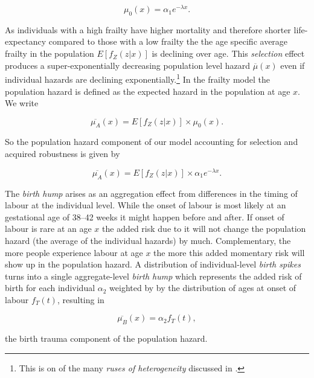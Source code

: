 \documentclass[12pt, parskip=half]{scrartcl}
\begin{document}
\begin{equation}
  \mu_0(x) = \alpha_1 e^{-\lambda x}.
  \label{eq:baselinehzrd}
\end{equation}

As individuals with a high frailty have higher mortality and therefore shorter life-expectancy compared to those with a low frailty the the age specific average frailty in the population $E[f_Z(z|x)]$ is declining over age. This \emph{selection} effect produces a super-exponentially decreasing population level hazard $\overline{\mu}(x)$ even if individual hazards are declining exponentially.\footnote{This is on of the many \emph{ruses of heterogeneity} discussed in \cite{Vaupel1985}.} In the frailty model the population hazard is defined as the expected hazard in the population at age $x$. We write

\begin{equation}
  \overline{\mu_A}(x) = E[f_Z(z|x)] \times \mu_0(x).
  \label{eq:pophzrd_frailty1}
\end{equation}

So the population hazard component of our model accounting for selection and acquired robustness is given by

\begin{equation}
  \overline{\mu_A}(x) = E[f_Z(z|x)] \times \alpha_1 e^{-\lambda x}.
  \label{eq:pophzrd_frailty2}
\end{equation}

The \emph{birth hump} arises as an aggregation effect from differences in the timing of labour at the individual level. While the onset of labour is most likely at an gestational age of 38--42 weeks it might happen before and after. If onset of labour is rare at an age $x$ the added risk due to it will not change the population hazard (the average of the individual hazards) by much. Complementary, the more people experience labour at age $x$ the more this added momentary risk will show up in the population hazard. A distribution of individual-level \emph{birth spikes} turns into a single aggregate-level \emph{birth hump} which represents the added risk of birth for each individual $\alpha_2$ weighted by by the distribution of ages at onset of labour $f_T(t)$, resulting in

\begin{equation}
  \overline{\mu_B}(x) = \alpha_2 f_T(t),
\end{equation}

the birth trauma component of the population hazard.
\end{document}
